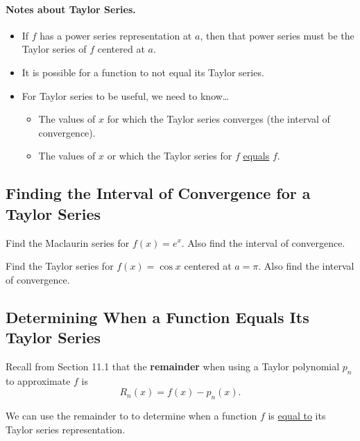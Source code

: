 \documentclass[12pt]{article}
\begin{document}
\paragraph{Notes about Taylor Series.}
\begin{itemize}
\item If $f$ has a power series representation at $a$, then that power series must be the Taylor series of $f$ centered at $a$.
\item It is possible for a function to not equal its Taylor series.
\item For Taylor series to be useful, we need to know\dots
\begin{itemize}
	\item The values of $x$ for which the Taylor series converges (the interval of convergence).
	\item The values of $x$ or which the Taylor series for $f$ \underline{equals} $f$.
\end{itemize}
\end{itemize}

\newpage


\subsection*{Finding the Interval of Convergence for a Taylor Series}
\Example Find the Maclaurin series for $f(x)=e^x$. Also find the interval of convergence.

\vfill

\Example Find the Taylor series for $f(x)=\cos x$ centered at $a=\pi$. Also find the interval of convergence.

\vfill

\newpage

\subsection*{Determining When a Function Equals Its Taylor Series}

Recall from Section 11.1 that the \textbf{remainder} when using a Taylor polynomial $p_n$ to approximate $f$ is
$$R_n(x)=f(x)-p_n(x).$$

We can use the remainder to to determine when a function $f$ is \underline{equal to} its Taylor series representation.

\vspace{4mm}

\end{document}

